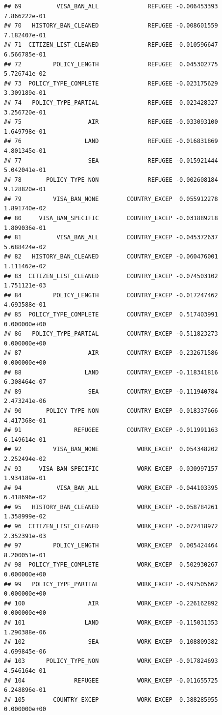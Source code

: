 \documentclass[]{article}
\begin{document}
\begin{verbatim}
## 69          VISA_BAN_ALL              REFUGEE -0.006453393 7.866222e-01
## 70   HISTORY_BAN_CLEANED              REFUGEE -0.008601559 7.182407e-01
## 71  CITIZEN_LIST_CLEANED              REFUGEE -0.010596647 6.566785e-01
## 72         POLICY_LENGTH              REFUGEE  0.045302775 5.726741e-02
## 73  POLICY_TYPE_COMPLETE              REFUGEE -0.023175629 3.309189e-01
## 74   POLICY_TYPE_PARTIAL              REFUGEE  0.023428327 3.256720e-01
## 75                   AIR              REFUGEE -0.033093100 1.649798e-01
## 76                  LAND              REFUGEE -0.016831869 4.801345e-01
## 77                   SEA              REFUGEE -0.015921444 5.042041e-01
## 78       POLICY_TYPE_NON              REFUGEE -0.002608184 9.128820e-01
## 79         VISA_BAN_NONE        COUNTRY_EXCEP  0.055912278 1.891740e-02
## 80     VISA_BAN_SPECIFIC        COUNTRY_EXCEP -0.031889218 1.809036e-01
## 81          VISA_BAN_ALL        COUNTRY_EXCEP -0.045372637 5.688424e-02
## 82   HISTORY_BAN_CLEANED        COUNTRY_EXCEP -0.060476001 1.111462e-02
## 83  CITIZEN_LIST_CLEANED        COUNTRY_EXCEP -0.074503102 1.751121e-03
## 84         POLICY_LENGTH        COUNTRY_EXCEP -0.017247462 4.693588e-01
## 85  POLICY_TYPE_COMPLETE        COUNTRY_EXCEP  0.517403991 0.000000e+00
## 86   POLICY_TYPE_PARTIAL        COUNTRY_EXCEP -0.511823273 0.000000e+00
## 87                   AIR        COUNTRY_EXCEP -0.232671586 0.000000e+00
## 88                  LAND        COUNTRY_EXCEP -0.118341816 6.308464e-07
## 89                   SEA        COUNTRY_EXCEP -0.111940784 2.473241e-06
## 90       POLICY_TYPE_NON        COUNTRY_EXCEP -0.018337666 4.417368e-01
## 91               REFUGEE        COUNTRY_EXCEP -0.011991163 6.149614e-01
## 92         VISA_BAN_NONE           WORK_EXCEP  0.054348202 2.252494e-02
## 93     VISA_BAN_SPECIFIC           WORK_EXCEP -0.030997157 1.934189e-01
## 94          VISA_BAN_ALL           WORK_EXCEP -0.044103395 6.418696e-02
## 95   HISTORY_BAN_CLEANED           WORK_EXCEP -0.058784261 1.358999e-02
## 96  CITIZEN_LIST_CLEANED           WORK_EXCEP -0.072418972 2.352391e-03
## 97         POLICY_LENGTH           WORK_EXCEP  0.005424464 8.200051e-01
## 98  POLICY_TYPE_COMPLETE           WORK_EXCEP  0.502930267 0.000000e+00
## 99   POLICY_TYPE_PARTIAL           WORK_EXCEP -0.497505662 0.000000e+00
## 100                  AIR           WORK_EXCEP -0.226162892 0.000000e+00
## 101                 LAND           WORK_EXCEP -0.115031353 1.290388e-06
## 102                  SEA           WORK_EXCEP -0.108809382 4.699845e-06
## 103      POLICY_TYPE_NON           WORK_EXCEP -0.017824693 4.546164e-01
## 104              REFUGEE           WORK_EXCEP -0.011655725 6.248896e-01
## 105        COUNTRY_EXCEP           WORK_EXCEP  0.388285955 0.000000e+00
\end{verbatim}
\end{document}

